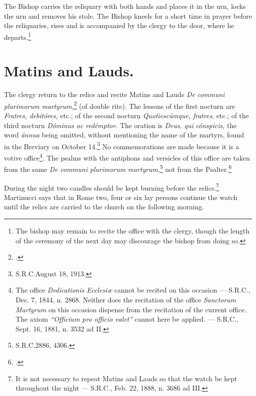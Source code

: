 \documentclass[letterpaper]{report}
\newcommand\src{\textsc{S.R.C.}}
\begin{document}
{    \rubric The Bishop carries the reliquary with both hands and places it in
    the urn, locks the urn and removes his stole. The Bishop kneels for a short
    time in prayer before the reliquaries, rises and is accompanied by the
    clergy to the door, where he departs.\footnote{The bishop may remain to
    recite the office with the clergy, though the length of the ceremony of the
    next day may discourage the bishop from doing so.}

    \section{Matins and Lauds.}

    \rubric The clergy return to the relics and recite Matins and Lauds
    \textit{De communi plurimorum martyrum,}\footcite[If the relics are of
    martyrs who have a proper office in the Breviary, e.g., Ss. Vincent and
    Anastasius, Ss. Fabian and Sevastian, etc., the proper office of these
    martyrs may be recited.][n. 21, footnote 2, p. 25.]{consecranda:1956} (of
    double rite). The lessons of the first nocturn are \textit{Fratres,
    debit\'ores,} etc.; of the second nocturn \textit{Quotiesc\'umque,
    fratres,} etc.; of the third nocturn \textit{D\'ominus ac red\'emptor.} The
    oration is \textit{Deus, qui c\'onspicis,} the word \textit{\'annua} being
    omitted, without mentioning the name of the martyrs, found in the Breviary
    on October 14.\footnote{\src August 18, 1913.} No commemorations are made
    because it is a votive office\footnote{The office \textit{Dedicationis
    Ecclesi\ae} cannot be recited on this occasion --- \src, Dec. 7, 1844, n.
    2868. Neither does the recitation of the office \textit{Sanctorum Martyrum}
    on this occasion dispense from the recitation of the current office. The
    axiom \textit{``Officium pro officio valet''} cannot here be applied. ---
    \src, Sept. 16, 1881, n. 3532 ad II.}. The psalms with the antiphons and
    versicles of this office are taken from the same \textit{De communi
    plurimorum martyrum,}\footnote{\src 2886, 4306.} not from the
    Psalter.\footcite[][n. 738.]{ml:1947}

    \rubric During the night two candles should be kept burning before the
    relics.\footnote{It is not necessary to repeat Matins and Lauds so that the
    watch be kept throughout the night --- \src, Feb. 22, 1888, n. 3686 ad
    III.} Martinucci says that in Rome two, four or six lay persons continue
    the watch until the relics are carried to the church on the following
    morning.

}
\end{document}

